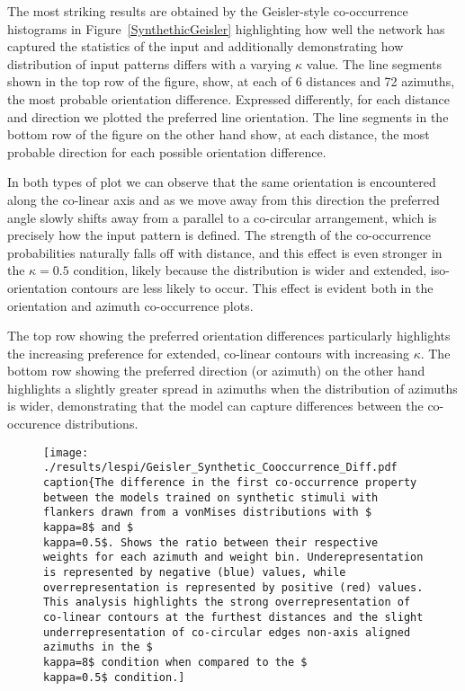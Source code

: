 The most striking results are obtained by the Geisler-style
co-occurrence histograms in Figure~\ref{SynthethicGeisler}
highlighting how well the network has captured the statistics of the
input and additionally demonstrating how distribution of input
patterns differs with a varying $\kappa$ value. The line segments
shown in the top row of the figure, show, at each of 6 distances and
72 azimuths, the most probable orientation difference. Expressed
differently, for each distance and direction we plotted the preferred
line orientation. The line segments in the bottom row of the figure on
the other hand show, at each distance, the most probable direction for
each possible orientation difference.

In both types of plot we can observe that the same orientation is
encountered along the co-linear axis and as we move away from this
direction the preferred angle slowly shifts away from a parallel to a
co-circular arrangement, which is precisely how the input pattern is
defined. The strength of the co-occurrence probabilities naturally
falls off with distance, and this effect is even stronger in the
$\kappa=0.5$ condition, likely because the distribution is wider and
extended, iso-orientation contours are less likely to occur. This
effect is evident both in the orientation and azimuth co-occurrence
plots.

The top row showing the preferred orientation differences particularly
highlights the increasing preference for extended, co-linear contours
with increasing $\kappa$. The bottom row showing the preferred
direction (or azimuth) on the other hand highlights a slightly greater
spread in azimuths when the distribution of azimuths is wider,
demonstrating that the model can capture differences between the
co-occurence distributions.

\begin{figure}
  \centering
  \texttt{[image: ./results/lespi/Geisler\_Synthetic\_Cooccurrence\_Diff.pdf
	\\caption\{The difference in the first co-occurrence property
      between the models trained on synthetic stimuli with flankers
      drawn from a vonMises distributions with \$\\kappa=8\$ and
      \$\\kappa=0.5\$. Shows the ratio between their respective weights
      for each azimuth and weight bin. Underepresentation is
      represented by negative (blue) values, while overrepresentation
      is represented by positive (red) values. This analysis
      highlights the strong overrepresentation of co-linear contours
      at the furthest distances and the slight underrepresentation of
      co-circular edges non-axis aligned azimuths in the \$\\kappa=8\$
      condition when compared to the \$\\kappa=0.5\$ condition.]}
	\label{SyntheticGeislerDiff}
\end{figure}

